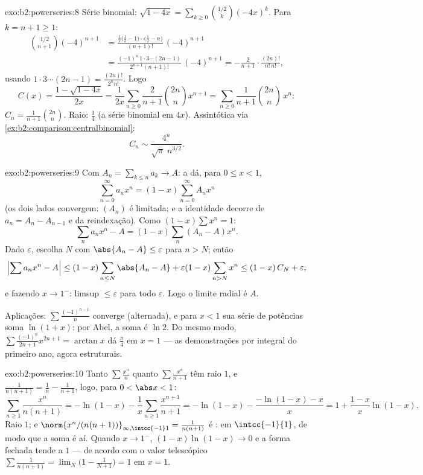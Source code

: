 \begin{solution}{exo:b2:powerseries:8}
Série binomial: $\sqrt{1-4x} = \sum_{k\geq0}
\binom{1/2}{k}(-4x)^k$. Para $k = n + 1 \geq 1$:
\begin{align*}
\binom{1/2}{n+1}(-4)^{n+1}
&= \frac{\frac12\bigl(\frac12 - 1\bigr)\cdots\bigl(\frac12 -
n\bigr)}{(n+1)!}\,(-4)^{n+1}\\
&= \frac{(-1)^n\,1\cdot3\cdots(2n-1)}{2^{n+1}(n+1)!}\,(-4)^{n+1}
= -\frac{2}{n+1}\cdot\frac{(2n)!}{n!\,n!} ,
\end{align*}
usando $1\cdot3\cdots(2n-1) = \frac{(2n)!}{2^n n!}$. Logo
\[
C(x) = \frac{1 - \sqrt{1-4x}}{2x}
= \frac{1}{2x}\sum_{n\geq0}\frac{2}{n+1}\binom{2n}{n}x^{n+1}
= \sum_{n\geq0} \frac{1}{n+1}\binom{2n}{n}\,x^n :
\]
$C_n = \frac{1}{n+1}\binom{2n}{n}$. Raio: $\frac14$ (a série
binomial em $4x$). Assintótica via
\cref{ex:b2:comparison:centralbinomial}:
\[
C_n \sim \frac{4^n}{\sqrt{\pi}\; n^{3/2}} .
\]
\end{solution}

\begin{solution}{exo:b2:powerseries:9}
Com $A_n = \sum_{k \leq n} a_k \to A$: a  dá, para
$0 \leq x < 1$,
\[
\sum_{n=0}^{\infty} a_n x^n = (1 - x)\sum_{n=0}^{\infty} A_n x^n
\]
(os dois lados convergem: $(A_n)$ é limitada; e a identidade decorre
de $a_n = A_n - A_{n-1}$ e da reindexação). Como $(1 -
x)\sum x^n = 1$:
\[
\sum_n a_nx^n - A = (1-x)\sum_{n} (A_n - A)x^n .
\]
Dado $\varepsilon$, escolha $N$ com $\abs{A_n - A} \leq
\varepsilon$ para $n > N$; então
\[
\Bigl|\sum a_nx^n - A\Bigr|
\leq (1-x)\sum_{n \leq N}\abs{A_n - A} + \varepsilon(1 -
x)\sum_{n > N}x^n
\leq (1-x)\,C_N + \varepsilon ,
\]
e fazendo $x \to 1^-$: limsup $\leq \varepsilon$ para todo
$\varepsilon$. Logo o limite radial é $A$.

Aplicações: $\sum \frac{(-1)^{n-1}}{n}$ converge (alternada),
e para $x < 1$ sua série de potências soma $\ln(1 + x)$: por Abel,
a soma é $\ln 2$. Do mesmo modo, $\sum\frac{(-1)^n}{2n+1}x^{2n+1} =
\arctan x$ dá $\frac\pi4$ em $x = 1$ --- as demonstrações por
integral do primeiro ano, agora estruturais.
\end{solution}

\begin{solution}{exo:b2:powerseries:10}
Tanto $\sum\frac{x^n}{n}$ quanto $\sum\frac{x^n}{n+1}$ têm raio
$1$, e $\frac{1}{n(n+1)} = \frac1n - \frac1{n+1}$, logo, para $0
< \abs x < 1$:
\[
\sum_{n\geq1}\frac{x^n}{n(n+1)}
= -\ln(1-x) - \frac1x\sum_{n\geq1}\frac{x^{n+1}}{n+1}
= -\ln(1-x) - \frac{-\ln(1-x) - x}{x}
= 1 + \frac{1-x}{x}\ln(1-x) .
\]
Raio $1$; e $\norm{x^n/(n(n+1))}_{\infty,\intcc{-1}1} =
\frac{1}{n(n+1)}$ é :  em
$\intcc{-1}{1}$, de modo que a soma é  aí. Quando $x \to
1^-$, $(1-x)\ln(1-x) \to 0$ e a forma fechada tende a $1$ ---
de acordo com o valor telescópico $\sum\frac{1}{n(n+1)} =
\lim_N\bigl(1 - \frac{1}{N+1}\bigr) = 1$ em $x = 1$.
\end{solution}

